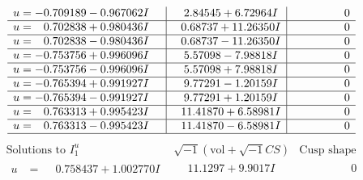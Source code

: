 \documentclass[1p]{elsarticle_modified}
\theoremstyle{definition}
\newcommand{\I}{\sqrt{-1}}
\begin{document}
$$\begin{array}{c|c|c}
\begin{aligned}
u &= -0.709189 - 0.967062 I\end{aligned}
 & \phantom{-}2.84545 + 6.72964 I & \phantom{-0.000000 } 0 \\ \hline\begin{aligned}
u &= \phantom{-}0.702838 + 0.980436 I\end{aligned}
 & \phantom{-}0.68737 + 11.26350 I & \phantom{-0.000000 } 0 \\ \hline\begin{aligned}
u &= \phantom{-}0.702838 - 0.980436 I\end{aligned}
 & \phantom{-}0.68737 - 11.26350 I & \phantom{-0.000000 } 0 \\ \hline\begin{aligned}
u &= -0.753756 + 0.996096 I\end{aligned}
 & \phantom{-}5.57098 - 7.98818 I & \phantom{-0.000000 } 0 \\ \hline\begin{aligned}
u &= -0.753756 - 0.996096 I\end{aligned}
 & \phantom{-}5.57098 + 7.98818 I & \phantom{-0.000000 } 0 \\ \hline\begin{aligned}
u &= -0.765394 + 0.991927 I\end{aligned}
 & \phantom{-}9.77291 - 1.20159 I & \phantom{-0.000000 } 0 \\ \hline\begin{aligned}
u &= -0.765394 - 0.991927 I\end{aligned}
 & \phantom{-}9.77291 + 1.20159 I & \phantom{-0.000000 } 0 \\ \hline\begin{aligned}
u &= \phantom{-}0.763313 + 0.995423 I\end{aligned}
 & \phantom{-}11.41870 + 6.58981 I & \phantom{-0.000000 } 0 \\ \hline\begin{aligned}
u &= \phantom{-}0.763313 - 0.995423 I\end{aligned}
 & \phantom{-}11.41870 - 6.58981 I & \phantom{-0.000000 } 0\\
 \hline 
 \end{array}$$\newpage$$\begin{array}{c|c|c}  
\text{Solutions to }I^u_{1}& \I (\text{vol} + \sqrt{-1}CS) & \text{Cusp shape}\\
 \hline 
\begin{aligned}
u &= \phantom{-}0.758437 + 1.002770 I\end{aligned}
 & \phantom{-}11.1297 + 9.9017 I & \phantom{-0.000000 } 0 \\ \hline\begin{aligned}

\end{aligned}
\end{array}$$
\end{document}
